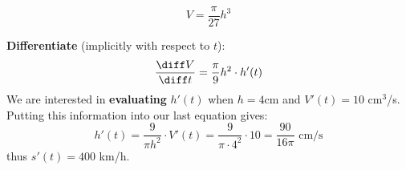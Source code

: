 \begin{frame}
\begin{example}
\[
V= \frac{\pi}{27} h^3
\] 

\textbf{Differentiate} (implicitly with respect to $ t $):\\
\[
 \frac{\diff V}{\diff t}=\frac{\pi}{9}  h^2 \cdot h'(t)
\]
\pause 
We are interested in \textbf{evaluating} $ h'(t) $ when  $h=4$cm and $V'(t) =
10$ cm$ ^3 $/s.  \pause 
Putting this information into our last equation gives:
\[
h'(t)= \frac{9}{\pi h^2}\cdot V'(t)= \frac{9}{\pi\cdot 4^2}\cdot 10= \frac{90}{16\pi}\text{ cm/s} 
\]
thus $s'(t)=400$ km/h.

\end{example}
\end{frame}

